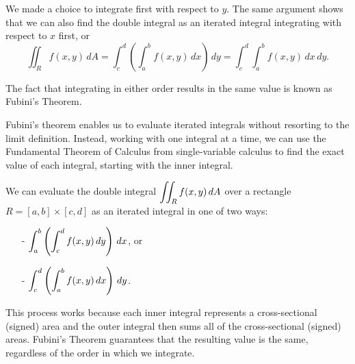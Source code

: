 We made a choice to integrate first with respect to $y$. The same argument shows that we can also find the double integral as an iterated integral integrating with respect to $x$ first, or
\[\iint_R f(x,y) \, dA = \int_c^d \left( \int_a^b f(x,y) \, dx \right) \, dy = \int_c^d  \int_a^b f(x,y) \, dx  \, dy.\]

The fact that integrating in either order results in the same value is known as Fubini's Theorem.

\vspace*{5pt}
\nin {}
\vspace*{5pt}

Fubini's theorem enables us to evaluate iterated integrals without resorting to the limit definition.  Instead, working with one integral at a time, we can use the Fundamental Theorem of Calculus from single-variable calculus to find the exact value of each integral, starting with the inner integral.





\begin{summary}	
\item We can evaluate the double integral $\displaystyle \iint_R f(x,y) \, dA$ over a rectangle $R = [a,b] \times [c,d]$ as an iterated integral in one of two ways:
    \begin{itemize}
    \item[-] $\displaystyle \int_a^b \left( \int_c^d f(x,y) \, dy \right) \, dx$, or
    \item[-] $\displaystyle \int_c^d \left( \int_a^b f(x,y) \, dx \right) \, dy$.
    \end{itemize}
This process works because each inner integral represents a cross-sectional (signed) area and the outer integral then sums all of the cross-sectional (signed) areas.  Fubini's Theorem guarantees that the resulting value is the same, regardless of the order in which we integrate.
\end{summary}


\nin \hrulefill



\clearpage
